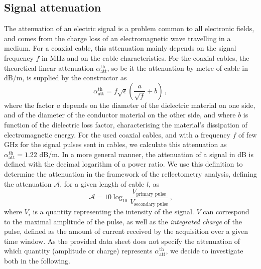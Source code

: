 \subsection{Signal attenuation}
\label{subsec:attenuation}
The attenuation of an electric signal is a problem common to all electronic fields, and comes from the charge loss of an electromagnetic wave travelling in a medium.
For a coaxial cable, this attenuation mainly depends on the signal frequency $f$ in MHz and on the cable characteristics.
For the coaxial cables, the theoretical linear attenuation $\alpha_{\text{att}}^{\text{th}}$, so be it the attenuation by metre of cable in dB/m, is supplied by the constructor as
\begin{equation}
  \alpha_{\text{att}}^{\text{th}} = f\sqrt{\epsilon}(\frac{a}{\sqrt{f}}+b)\,,
\end{equation}
where the factor $a$ depends on the diameter of the dielectric material on one side, and of the diameter of the conductor material on the other side, and where $b$ is function of the dielectric loss factor, characterising the material's dissipation of electromagnetic energy.
For the used coaxial cables, and with a frequency $f$ of few GHz for the signal pulses sent in cables, we calculate this attenuation as $\alpha_{\text{att}}^{\text{th}} = 1.22$ dB/m.
In a more general manner, the attenuation of a signal in dB is defined with the decimal logarithm of a power ratio.
We use this definition to determine the attenuation in the framework of the reflectometry analysis, defining the attenuation $\mathcal{A}$, for a given length of cable $l$, as
\begin{equation}
  \mathcal{A}=10\log_{10}\frac{V_{\text{primary pulse}}}{V_{\text{secondary pulse}}} \,\text{,}
\end{equation}
where $V_{i}$ is a quantity representing the intensity of the signal.
$V$ can correspond to the maximal amplitude of the pulse, as well as the \emph{integrated charge} of the pulse, defined as the amount of current received by the acquisition over a given time window.
As the provided data sheet does not specify the attenuation of which quantity (amplitude or charge) represents $\alpha_{\text{att}}^{\text{th}}$, we decide to investigate both in the following.
